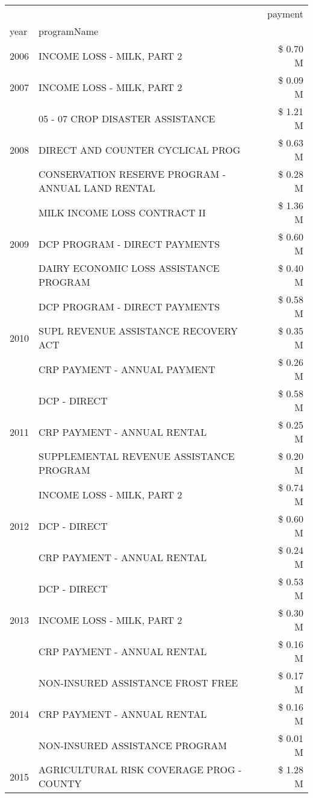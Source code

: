 \begin{tabular}{llr}
\toprule
 &  & payment \\
year & programName &  \\
\midrule
2006 & INCOME LOSS - MILK, PART 2 & \$ 0.70 M \\
\cline{1-3}
2007 & INCOME LOSS - MILK, PART 2 & \$ 0.09 M \\
\cline{1-3}
\multirow[t]{3}{*}{2008} & 05 - 07 CROP DISASTER ASSISTANCE & \$ 1.21 M \\
 & DIRECT AND COUNTER CYCLICAL PROG & \$ 0.63 M \\
 & CONSERVATION RESERVE PROGRAM - ANNUAL LAND RENTAL & \$ 0.28 M \\
\cline{1-3}
\multirow[t]{3}{*}{2009} & MILK INCOME LOSS CONTRACT II & \$ 1.36 M \\
 & DCP PROGRAM - DIRECT PAYMENTS & \$ 0.60 M \\
 & DAIRY ECONOMIC LOSS ASSISTANCE PROGRAM & \$ 0.40 M \\
\cline{1-3}
\multirow[t]{3}{*}{2010} & DCP PROGRAM - DIRECT PAYMENTS & \$ 0.58 M \\
 & SUPL REVENUE ASSISTANCE RECOVERY ACT & \$ 0.35 M \\
 & CRP PAYMENT - ANNUAL PAYMENT & \$ 0.26 M \\
\cline{1-3}
\multirow[t]{3}{*}{2011} & DCP - DIRECT & \$ 0.58 M \\
 & CRP PAYMENT - ANNUAL RENTAL & \$ 0.25 M \\
 & SUPPLEMENTAL REVENUE ASSISTANCE PROGRAM & \$ 0.20 M \\
\cline{1-3}
\multirow[t]{3}{*}{2012} & INCOME LOSS - MILK, PART 2 & \$ 0.74 M \\
 & DCP - DIRECT & \$ 0.60 M \\
 & CRP PAYMENT - ANNUAL RENTAL & \$ 0.24 M \\
\cline{1-3}
\multirow[t]{3}{*}{2013} & DCP - DIRECT & \$ 0.53 M \\
 & INCOME LOSS - MILK, PART 2 & \$ 0.30 M \\
 & CRP PAYMENT - ANNUAL RENTAL & \$ 0.16 M \\
\cline{1-3}
\multirow[t]{3}{*}{2014} & NON-INSURED ASSISTANCE FROST FREE & \$ 0.17 M \\
 & CRP PAYMENT - ANNUAL RENTAL & \$ 0.16 M \\
 & NON-INSURED ASSISTANCE PROGRAM & \$ 0.01 M \\
\cline{1-3}
\multirow[t]{3}{*}{2015} & AGRICULTURAL RISK COVERAGE PROG - COUNTY & \$ 1.28 M \\

\end{tabular}
